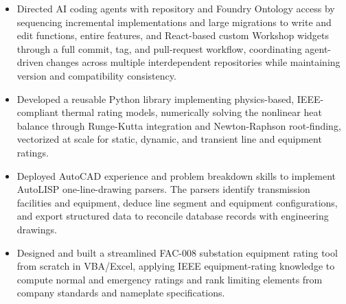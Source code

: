 \documentclass[10pt, letterpaper]{article}
\newenvironment{rlist}{%
  \begin{itemize}[leftmargin=1.4em, itemsep=1pt, topsep=2pt, parsep=0pt]%
}{%
  \end{itemize}%
}
\begin{document}
\begin{rlist}
  \item Directed AI coding agents with repository and Foundry Ontology access by sequencing incremental implementations and large migrations to write and edit functions, entire features, and React-based custom Workshop widgets through a full commit, tag, and pull-request workflow, coordinating agent-driven changes across multiple interdependent repositories while maintaining version and compatibility consistency.
  \item Developed a reusable Python library implementing physics-based, IEEE-compliant thermal rating models, numerically solving the nonlinear heat balance through Runge-Kutta integration and Newton-Raphson root-finding, vectorized at scale for static, dynamic, and transient line and equipment ratings.
  \item Deployed AutoCAD experience and problem breakdown skills to implement AutoLISP one-line-drawing parsers. The parsers identify transmission facilities and equipment, deduce line segment and equipment configurations, and export structured data to reconcile database records with engineering drawings.
  \item Designed and built a streamlined FAC-008 substation equipment rating tool from scratch in VBA/Excel, applying IEEE equipment-rating knowledge to compute normal and emergency ratings and rank limiting elements from company standards and nameplate specifications.
\end{rlist}
\end{document}
